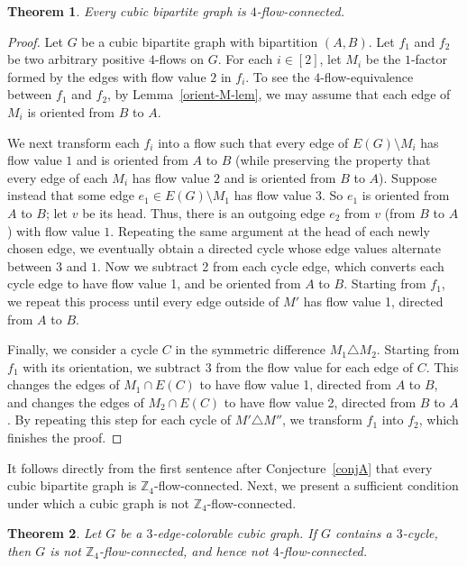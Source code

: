 \documentclass[a4paper,12pt]{article}
\theoremstyle{plain}
\newtheorem{theorem}{Theorem}[section]
\theoremstyle{definition}
\newcommand{\Z}{\mathbb{Z}}
\begin{document}
\begin{theorem}\label{thm:4-flow-bipartite-cubic}
Every cubic bipartite graph is $4$-flow-connected.
\end{theorem}

\begin{proof}
Let $G$ be a cubic bipartite graph with bipartition $(A,B)$. Let $f_1$ and $f_2$ be two arbitrary positive $4$-flows on $G$. For each $i\in[2]$, let $M_i$ be the $1$-factor formed by the edges with flow value $2$ in $f_i$. To see the $4$-flow-equivalence between $f_1$ and $f_2$, by Lemma~\ref{orient-M-lem}, we may assume that each edge of $M_i$ is oriented from $B$ to $A$.  

We next transform each $f_i$ into a flow such that every edge of $E(G)\setminus M_i$ has flow value $1$ and is oriented from $A$ to $B$ (while preserving the property that every edge of each $M_i$ has flow value $2$ and is oriented from $B$ to $A$).
Suppose instead that some edge $e_1\in E(G)\setminus M_1$ has flow value 3. So $e_1$ is oriented from $A$ to $B$; let $v$ be its head. Thus, there is an outgoing edge $e_2$ from $v$ (from $B$ to $A$) with flow value $1$.
Repeating the same argument at the head of each newly chosen edge, we eventually obtain a directed cycle whose edge values alternate between $3$ and $1$. Now we subtract 2 from each cycle edge, which converts each cycle edge to have flow value 1, and be oriented from $A$ to $B$. Starting from $f_1$, we repeat this process until every edge outside of $M'$ has flow value 1, directed from $A$ to $B$.

Finally, we consider a cycle $C$ in the symmetric difference $M_1\triangle M_2$.  Starting from $f_1$ with its orientation, we subtract 3 from the flow value for each edge of $C$.  This changes the edges of $M_1\cap E(C)$ to have flow value 1, directed from $A$ to $B$, and changes the edges of $M_2\cap E(C)$ to have flow value 2, directed from $B$ to $A$. By repeating this step for each cycle of $M'\triangle M''$, we transform $f_1$ into $f_2$, which finishes the proof.
\end{proof}

It follows directly from the first sentence after Conjecture~\ref{conjA} that every cubic bipartite graph is $\mathbb Z_4$-flow-connected. Next, we present a sufficient condition under which a cubic graph is not $\mathbb{Z}_4$-flow-connected.

\begin{theorem}\label{notZ4flow-connectedII}
Let $G$ be a $3$-edge-colorable cubic graph. If $G$ contains a $3$-cycle, then $G$ is not $\Z_4$-flow-connected, and hence not $4$-flow-connected.
\end{theorem}
\end{document}
